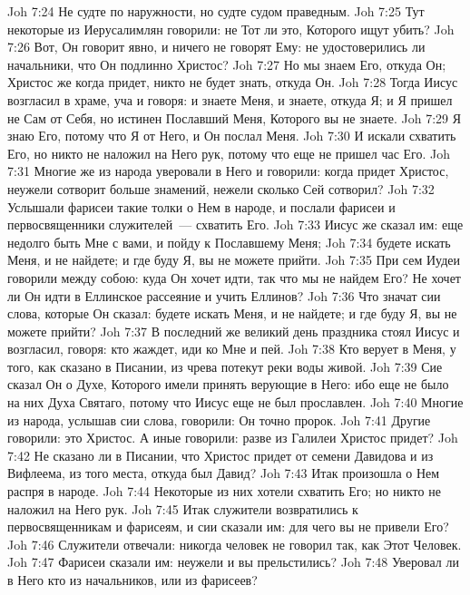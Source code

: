 \vs Joh 7:24 Не судте по наружности, но судте судом праведным.
\vs Joh 7:25 Тут некоторые из Иерусалимлян говорили: не Тот ли это, Которого ищут убить?
\vs Joh 7:26 Вот, Он говорит явно, и ничего не говорят Ему: не удостоверились ли начальники, что Он подлинно Христос?
\vs Joh 7:27 Но мы знаем Его, откуда Он; Христос же когда придет, никто не будет знать, откуда Он.
\vs Joh 7:28 Тогда Иисус возгласил в храме, уча и говоря: и знаете Меня, и знаете, откуда Я; и Я пришел не Сам от Себя, но истинен Пославший Меня, Которого вы не знаете.
\vs Joh 7:29 Я знаю Его, потому что Я от Него, и Он послал Меня.
\vs Joh 7:30 И искали схватить Его, но никто не наложил на Него рук, потому что еще не пришел час Его.
\vs Joh 7:31 Многие же из народа уверовали в Него и говорили: когда придет Христос, неужели сотворит больше знамений, нежели сколько Сей сотворил?
\vs Joh 7:32 Услышали фарисеи такие толки о Нем в народе, и послали фарисеи и первосвященники служителей~--- схватить Его.
\vs Joh 7:33 Иисус же сказал им: еще недолго быть Мне с вами, и пойду к Пославшему Меня;
\vs Joh 7:34 будете искать Меня, и не найдете; и где буду Я,  вы не можете прийти.
\vs Joh 7:35 При сем Иудеи говорили между собою: куда Он хочет идти, так что мы не найдем Его? Не хочет ли Он идти в Еллинское рассеяние и учить Еллинов?
\vs Joh 7:36 Что значат сии слова, которые Он сказал: будете искать Меня, и не найдете; и где буду Я,  вы не можете прийти?
\rsbpar\vs Joh 7:37 В последний же великий день праздника стоял Иисус и возгласил, говоря: кто жаждет, иди ко Мне и пей.
\vs Joh 7:38 Кто верует в Меня, у того, как сказано в Писании, из чрева потекут реки воды живой.
\vs Joh 7:39 Сие сказал Он о Духе, Которого имели принять верующие в Него: ибо еще не было на них Духа Святаго, потому что Иисус еще не был прославлен.
\vs Joh 7:40 Многие из народа, услышав сии слова, говорили: Он точно пророк.
\vs Joh 7:41 Другие говорили: это Христос. А иные говорили: разве из Галилеи Христос придет?
\vs Joh 7:42 Не сказано ли в Писании, что Христос придет от семени Давидова и из Вифлеема, из того места, откуда был Давид?
\vs Joh 7:43 Итак произошла о Нем распря в народе.
\vs Joh 7:44 Некоторые из них хотели схватить Его; но никто не наложил на Него рук.
\vs Joh 7:45 Итак служители возвратились к первосвященникам и фарисеям, и сии сказали им: для чего вы не привели Его?
\vs Joh 7:46 Служители отвечали: никогда человек не говорил так, как Этот Человек.
\vs Joh 7:47 Фарисеи сказали им: неужели и вы прельстились?
\vs Joh 7:48 Уверовал ли в Него кто из начальников, или из фарисеев?
